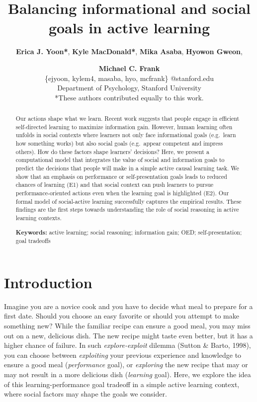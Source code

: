 \documentclass[10pt, letterpaper]{article}
\title{Balancing informational and social goals in active learning}
\author{{\large \bf Erica J. Yoon*}, {\large \bf Kyle MacDonald*}, {\large \bf Mika Asaba}, {\large \bf Hyowon Gweon}, \and {\large \bf Michael C. Frank} \\ \{ejyoon, kylem4, masaba, hyo, mcfrank\} @stanford.edu \\ Department of Psychology, Stanford University \\ *These authors contributed equally to this work.}
\begin{document}
\maketitle

\begin{abstract}
Our actions shape what we learn. Recent work suggests that people engage
in efficient self-directed learning to maximize information gain.
However, human learning often unfolds in social contexts where learners
not only face informational goals (e.g.~learn how something works) but
also social goals (e.g.~appear competent and impress others). How do
these factors shape learners' decisions? Here, we present a
computational model that integrates the value of social and information
goals to predict the decisions that people will make in a simple active
causal learning task. We show that an emphasis on performance or
self-presentation goals leads to reduced chances of learning (E1) and
that social context can push learners to pursue performance-oriented
actions even when the learning goal is highlighted (E2). Our formal
model of social-active learning successfully captures the empirical
results. These findings are the first steps towards understanding the
role of social reasoning in active learning contexts.

\textbf{Keywords:}
active learning; social reasoning; information gain; OED;
self-presentation; goal tradeoffs
\end{abstract}

\section{Introduction}\label{introduction}

Imagine you are a novice cook and you have to decide what meal to
prepare for a first date. Should you choose an easy favorite or should
you attempt to make something new? While the familiar recipe can ensure
a good meal, you may miss out on a new, delicious dish. The new recipe
might taste even better, but it has a higher chance of failure. In such
\emph{explore-exploit} dilemma (Sutton \& Barto, 1998), you can choose
between \emph{exploiting} your previous experience and knowledge to
ensure a good meal (\emph{performance} goal), or \emph{exploring} the
new recipe that may or may not result in a more delicious dish
(\emph{learning} goal). Here, we explore the idea of this
learning-performance goal tradeoff in a simple active learning context,
where social factors may shape the goals we consider.
\end{document}
